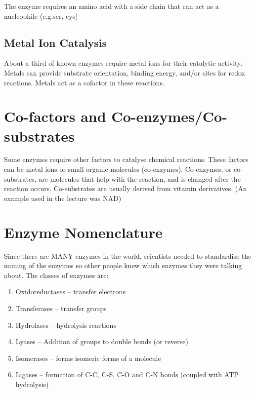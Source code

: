 \begin{center}
\end{center}

The enzyme requires an amino acid with a side chain that can act as a nucleophile (e.g.ser, cys)

\subsection{Metal Ion Catalysis}

About a third of known enzymes require metal ions for their catalytic activity.
Metals can provide substrate orientation, binding energy, and/or sites for redox reactions.
Metals act as a cofactor in these reactions.

\section{Co-factors and Co-enzymes/Co-substrates}

Some enzymes require other factors to catalyse chemical reactions.
These factors can be metal ions or small organic molecules (co-enzymes).
Co-enzymes, or co-substrates, are molecules that help with the reaction, and is changed after the reaction occurs.
Co-substrates are usually derived from vitamin derivatives.
(An example used in the lecture was NAD)

\section{Enzyme Nomenclature}

Since there are MANY enzymes in the world, scientists needed to standardise the naming of the enzymes so other people knew which enzymes they were talking about.
The classes of enzymes are:

\begin{enumerate}
\item Oxidoreductases -- transfer electrons
\item Transferases -- transfer groups
\item Hydrolases -- hydrolysis reactions
\item Lyases -- Addition of groups to double bonds (or reverse)
\item Isomerases -- forms isomeric forms of a molecule
\item Ligases -- formation of C-C, C-S, C-O and C-N bonds (coupled with ATP hydrolysis)
\end{enumerate}

